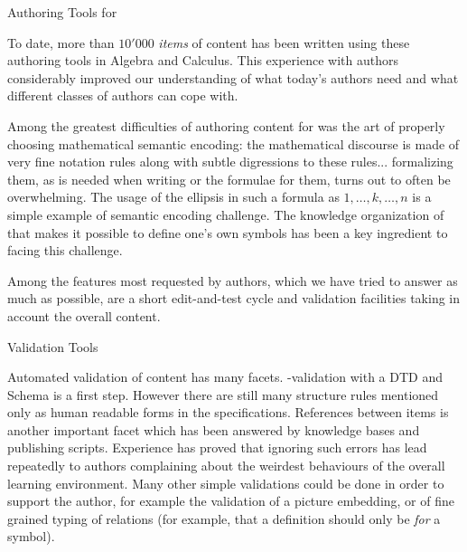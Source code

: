 \begin{omgroup}[id=jeditoqmath,creators=libbrecht]{Authoring Tools for {\activemath}}

To date, more than $10'000$ {\emph{items}} of {\omdoc} content has been written using
these authoring tools in Algebra and Calculus. This experience with authors considerably
improved our understanding of what today's authors need and what different classes of
authors can cope with.


Among the greatest difficulties of authoring content for {\activemath} was the art of
properly choosing mathematical semantic encoding: the mathematical discourse is made of
very fine notation rules along with subtle digressions to these rules...  formalizing
them, as is needed when writing {\openmath} or the {\qmath} formulae for them, turns out
to often be overwhelming.  The usage of the ellipsis in such a formula as $1, \dots, k,
\dots, n$ is a simple example of semantic encoding challenge. The knowledge organization
of {\omdoc} that makes it possible to define one's own {\openmath} symbols has been a key
ingredient to facing this challenge.

Among the features most requested by authors, which we have tried to answer 
as much as possible,  are a short edit-and-test cycle and validation facilities 
taking in account the overall content.

\begin{omgroup}{Validation Tools}

Automated validation of {\omdoc} content has many facets.
{\xml}-validation with a DTD and Schema is a first step.  However there are still many
structure rules mentioned only as human readable forms in the {\omdoc} specifications.
References between {\omdoc} items is another important facet which has been answered by
{\activemath} knowledge bases and publishing scripts.  Experience has proved that ignoring
such errors has lead repeatedly to authors complaining about the weirdest behaviours of
the overall learning environment.  Many other simple validations could be done in order to
support the author, for example the validation of a picture embedding, or of fine grained
typing of relations (for example, that a definition should only be {\emph{for}} a symbol).


\end{omgroup}
\end{omgroup}
